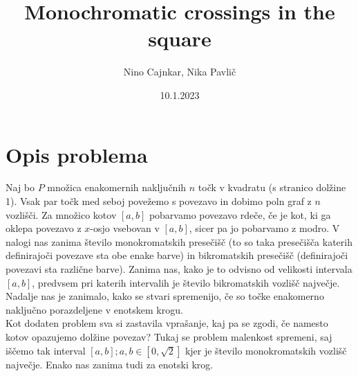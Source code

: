 \documentclass[12pt, a4paper]{article}
\title{Monochromatic crossings in the square}
\date{10.1.2023}
\author{Nino Cajnkar, Nika Pavlič}
\begin{document}
	\maketitle
	\section{Opis problema}
	Naj bo $P$ množica enakomernih naključnih $n$ točk v kvadratu (s stranico dolžine 1). Vsak par točk med seboj povežemo s povezavo in dobimo poln graf z $n$ vozlišči. Za množico kotov $\left[{a,b}\right]$ pobarvamo povezavo rdeče, če je kot, ki ga oklepa povezavo z $x$-osjo vsebovan v $\left[{a,b}\right]$, sicer pa jo pobarvamo z modro. V nalogi nas zanima število monokromatskih presečišč (to so taka presečišča katerih definirajoči povezave sta obe enake barve) in bikromatskih presečišč (definirajoči povezavi sta različne barve). Zanima nas, kako je to odvisno od velikosti intervala $\left[{a,b}\right]$, predvsem pri katerih intervalih je število bikromatskih vozlišč največje. \\
	Nadalje nas je zanimalo, kako se stvari spremenijo, če so točke enakomerno naključno porazdeljene v enotskem krogu. \\
	Kot dodaten problem sva si zastavila vprašanje, kaj pa se zgodi, če namesto kotov opazujemo dolžine povezav? Tukaj se problem malenkost spremeni, saj iščemo tak interval $\left[{a,b}\right]; a,b \in \left[0,\sqrt{2}\right]$ kjer je število monokromatskih vozlišč največje. Enako nas zanima tudi za enotski krog.
\end{document}
